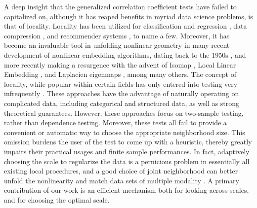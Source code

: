 \documentclass[11pt]{article}
\providecommand{\sct}[1]{{\sc \texttt{#1}}}
\newcommand{\Hhg}{\sct{Hhg}}
\begin{document}
A deep insight that the generalized correlation coefficient tests  have failed to capitalized on, although it has reaped benefits in myriad data science problems, is that of locality.  Locality has been utilized for classification and regression  \cite{Stone1977}, data compression \cite{DaubechiesWaveletBook}, and recommender systems \cite{Sarwar2000}, to name a few.
Moreover, it has become an invaluable tool in unfolding nonlinear geometry in many recent development of nonlinear embedding algorithms, dating back to the 1950s \cite{TorgersonBook}, and more recently making a resurgence with the advent of  Isomap \cite{TenenbaumSilvaLangford2000, SilvaTenenbaum2003}, Local Linear Embedding \cite{SaulRoweis2000, RoweisSaul2003}, and Laplacien eigenmaps \cite{BelkinNiyogi2003}, among many others. The concept of locality, while popular within certain fields has only entered into  testing very infrequently
\cite{David1966,Friedman1983,Schilling1986}.  These approaches have the advantage of naturally operating on complicated data, including categorical and structured data, as well as strong theoretical guarantees. However, these approaches focus on two-sample testing, rather than dependence testing. Moreover, these tests all fail to provide  a convenient or automatic way to choose the appropriate neighborhood size.  This omission burdens the user of the test to come up with a heuristic, thereby greatly impairs their practical usages and finite sample performances. In fact, adaptively choosing the scale to regularize the data is a pernicious problem in essentially all existing local procedures,
and a good choice of joint neighborhood can better unfold the nonlinearity and match data sets of multiple modality \cite{ShenVogelsteinPriebe2016}. A primary contribution of our work is an efficient mechanism both for looking across scales, and for choosing the optimal scale.


\end{document}
